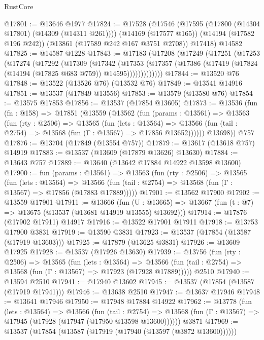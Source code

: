 \begin{lexlean}{RustCore}
\begin{coremodule}
@17801 := @13646 @1977
@17824 := @17528
    (@17546
      (@17595 (@17800 (@14304 @17801) (@14309 (@14311 @261))))
      (@14169 (@17577 @165))
      (@14194 (@17582 @196 @242))
      (@13861 (@17589 @242 @167 @3751 @2708))
      @17418)
    @14582
@17825 := @14587 @1228
@17843 := @17183
    (@17208
      (@17249
        (@17251
          (@17253
            (@17274
              (@17292
                (@17309
                  (@17342
                    (@17353
                      (@17357
                        (@17386 (@17419 (@17824 (@14194 (@17825 @683 @759)) @14595)))))))))))))
@17844 := @13520 @76
@17848 := @13522 (@13526 @76) (@13532 @76)
@17849 := @13541 @14916
@17851 := @13537 (@17849 @13556)
@17853 := @13579 (@13580 @76)
@17854 := @13575 @17853
@17856 := @13537 (@17854 @13605)
@17873 := @13536
    (fun (fn : @158) =>
    @17851
      (@13559
        (@13562
          (fun (params : @13561) =>
          @13563
            (fun (rty : @2506) =>
            @13565
              (fun (lets : @13564) =>
              @13566 (fun (tail : @2754) => @13568 (fun (Γ : @13567) => @17856 @13652))))))
        @13698))
    @757
@17876 := @13704 (@17849 (@13554 @757))
@17879 := @13617 (@13618 @757) @14919
@17883 := @13537 (@13609 (@17879 @13626) @13630)
@17884 := @13643 @757
@17889 := @13640 (@13642 @17884 @14922 @13598 @13600)
@17900 := fun (params : @13561) =>
  @13563
    (fun (rty : @2506) =>
    @13565
      (fun (lets : @13564) =>
      @13566 (fun (tail : @2754) => @13568 (fun (Γ : @13567) => @17856 (@17883 @17889)))))
@17901 := @13562 @17900
@17902 := @13559 @17901
@17911 := @13666
    (fun (U : @13665) => @13667 (fun (t : @7) => @13675 (@13537 (@13681 @14919 @13555) @13692)))
@17914 := @17876 (@17902 @17911) @14917
@17916 := @13522 @17901 @17911
@17918 := @13753 @17900 @3831
@17919 := @13590 @3831
@17923 := @13537 (@17854 (@13587 (@17919 @13603)))
@17925 := @17879 (@13625 @3831)
@17926 := @13609 @17925
@17928 := @13537 (@17926 @13630)
@17939 := @13756
    (fun (rty : @2506) =>
    @13565
      (fun (lets : @13564) =>
      @13566 (fun (tail : @2754) => @13568 (fun (Γ : @13567) => @17923 (@17928 @17889)))))
    @2510
@17940 := @13594 @2510
@17941 := @17940 @13602
@17945 := @13537 (@17854 (@13587 (@17919 @17941)))
@17946 := @13638 @2510
@17947 := @13637 @17946
@17948 := @13641 @17946
@17950 := @17948 @17884 @14922
@17962 := @13778
    (fun (lets : @13564) =>
    @13566
      (fun (tail : @2754) =>
      @13568 (fun (Γ : @13567) => @17945 (@17928 (@17947 (@17950 @13598 @13600))))))
    @3871
@17969 := @13537 (@17854 (@13587 (@17919 (@17940 (@13597 (@3872 @13600))))))

\end{coremodule}
\end{lexlean}
